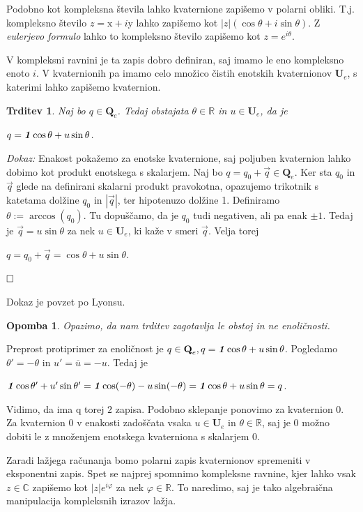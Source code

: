 \documentclass[a4paper,12pt]{article}
\def\R{\mathbb{R}} %
\def\C{\mathbb{C}} %
\def\Qe{\textbf{Q}_{e}} %
\def\Ue{\textbf{U}_{e}} %
\def\1{\textbf{\emph{1}}}
\newcommand{\conj}[1]{\overline{#1}}
\def\qed{$\hfill\Box$}   %
\newtheorem{trditev}{Trditev}
\newtheorem{opomba}{Opomba}
\begin{document}
Podobno kot kompleksna števila lahko kvaternione zapišemo v polarni obliki. T.j.
kompleksno število $z = \text{x} + i\text{y}$ lahko zapišemo kot $|z|( \cos\theta + i\sin\theta )$. Z \emph{eulerjevo formulo} lahko to kompleksno število
zapišemo kot $z = e^{i\theta}$.

V kompleksni ravnini je ta zapis dobro definiran, saj imamo le eno kompleksno enoto $i$.
V kvaternionih pa imamo celo množico čistih enotskih kvaternionov $\Ue$, s katerimi lahko zapišemo kvaternion.

\begin{trditev}
Naj bo $q \in \Qe$. Tedaj obstajata $\theta \in \R$ in $u \in \Ue$, da je
\begin{center}
   $q = \1\cos\theta + u\sin\theta$.
\end{center}
\end{trditev}


\noindent
{\em Dokaz: \/}Enakost pokažemo za enotske kvaternione, saj poljuben kvaternion lahko dobimo kot produkt enotskega s skalarjem.
Naj bo $q = q_{0} + \vec{q} \in \Qe$. Ker sta $q_{0}$ in $\vec{q}$ glede na definirani skalarni produkt pravokotna, opazujemo trikotnik s katetama dolžine $q_{0}$ in $|\vec{q}|$, ter hipotenuzo dolžine 1.
Definiramo $\theta := \arccos(q_{0})$. Tu dopuščamo, da je $q_{0}$ tudi negativen, ali pa enak $\pm 1$. Tedaj je $\vec{q} = u\sin\theta$ za nek $u \in \Ue$, ki kaže v smeri $\vec{q}$.
Velja torej
\begin{center}
   $q = q_{0} + \vec{q} = \cos\theta + u\sin\theta$.
\end{center}
\qed

\noindent Dokaz je povzet po Lyonsu. \cite{2021Quaternions}
\begin{opomba}
Opazimo, da nam trditev zagotavlja \emph{le obstoj} in ne enoličnosti.
\end{opomba}
\break
Preprost protiprimer za enoličnost je $q \in \Qe, q = \1\cos\theta + u\sin\theta$.
Pogledamo $\theta' = -\theta$ in $u' = \conj{u} = -u$. Tedaj je
\begin{center}
   $\1\cos\theta' + u'\sin\theta' = \1\cos(-\theta) -u\sin(-\theta) = \1\cos\theta + u\sin\theta = q$.
\end{center}
Vidimo, da ima q torej $2$ zapisa. Podobno sklepanje ponovimo za kvaternion 0. Za kvaternion 0 v enakosti zadoščata vsaka $u \in \Ue$ in $\theta \in \R$, saj je 0 možno dobiti le z množenjem enotskega kvaterniona
s skalarjem 0.
   
Zaradi lažjega računanja bomo polarni zapis kvaternionov spremeniti v eksponentni zapis. Spet se najprej spomnimo kompleksne ravnine, kjer lahko
vsak $z \in \C$ zapišemo kot $|z|e^{i\varphi}$ za nek $\varphi \in \R$. To naredimo, saj je tako
algebraična manipulacija kompleksnih izrazov lažja.
\end{document}
